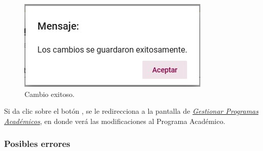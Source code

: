         \begin{figure}[H]
            \centering
            \hypertarget{cambio}{\includegraphics[width=0.7\linewidth]{images/SP3/Cambio}}
            \caption{Cambio exitoso.}
            \label{cambio}
        \end{figure}

        Si da clic sobre el botón , se le redirecciona a la pantalla de \hyperlink{consultarpa}{\textit{Gestionar Programas Académicos}}, en donde verá las modificaciones al Programa Académico.\\

        \subsubsection{Posibles errores}

